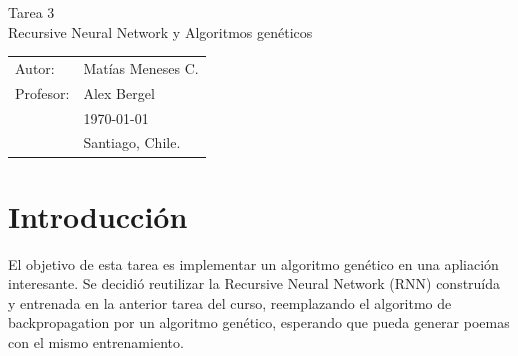 \documentclass[11pt,letterpaper]{article}
\begin{document}
\newpage
\pagestyle{fancy}
\fancyhf{}
\vspace*{6cm}
\begin{center}
\Huge  {Tarea 3}\\
\vspace{1cm}
\huge {Recursive Neural Network y Algoritmos genéticos}\\
\end{center}
\vfill
\begin{flushright}
\begin{tabular}{ll}
Autor: & Matías Meneses C.\\
Profesor: & Alex Bergel\\
& \today\\
& Santiago, Chile.
\end{tabular}
\end{flushright}

\newpage
\pagestyle{fancy}
\fancyhf{}

\fancyhead[R]{\small \rm \textbf{\thepage}} %



\renewcommand{\sectionmark}[1]{\markright{\thesection.\ #1}}
\renewcommand{\headrulewidth}{0.5pt}
\renewcommand{\footrulewidth}{0.5pt}


\tableofcontents

\newpage
\section{Introducción}
El objetivo de esta tarea es implementar un algoritmo genético en una 
apliación interesante. Se decidió reutilizar la Recursive Neural Network 
(RNN) construída y entrenada en la anterior tarea del curso, reemplazando 
el algoritmo de backpropagation por un algoritmo genético, esperando que 
pueda generar poemas con el mismo entrenamiento.\\
\end{document}
